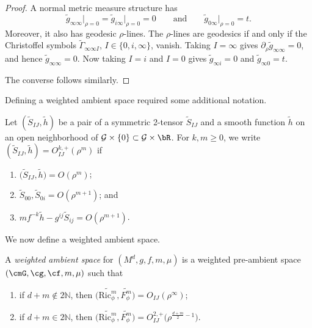 \begin{proof}
A normal metric measure structure has
\[
\widetilde{g}_{\infty\infty}\big|_{\rho=0}=\widetilde{g}_{i\infty}\big|_{\rho=0}=0 \qquad\text{and}\qquad \widetilde{g}_{0\infty}\big|_{\rho=0}=t.
\]
Moreover, it also has geodesic $\rho$-lines. The $\rho$-lines are geodesics if and only if the Christoffel symbols $\widetilde{\Gamma}_{\infty \infty I}$, $I\in \{0,i,\infty\}$, vanish. Taking $I=\infty$ gives $\partial_{\rho} \widetilde{g}_{\infty \infty}=0$, and hence $\widetilde{g}_{\infty \infty}=0 .$ Now taking $I=i$ and $I=0$ gives $\widetilde{g}_{\infty i}=0$ and $\widetilde{g}_{\infty 0}=t$.

The converse follows similarly.
\end{proof}
Defining a weighted ambient space required some additional notation.

\begin{Definition}
Let $(\widetilde{S}_{IJ},\widetilde{h})$ be a pair of a symmetric 2-tensor $\widetilde{S}_{IJ}$ and a smooth function $\widetilde{h}$ on an open neighborhood of $\mathcal{G}\times \{0\}\subset\mathcal{G}\times \bR$. For $k,m\geq 0$, we write $(\widetilde{S}_{IJ},\widetilde{h})=O_{IJ}^{k,+}(\rho^m)$ if
\begin{enumerate}[label=$(\roman*)$]\itemsep=0pt
\item $\big(\widetilde{S}_{IJ},\widetilde{h}\big)=O(\rho^{m})$;
\item $\widetilde{S}_{00},\widetilde{S}_{0i}=O(\rho^{m+1})$; and
\item $m f^{-k}\widetilde{h}-g^{ij}\widetilde{S}_{ij}= O(\rho^{m+1})$.
\end{enumerate}
\end{Definition}

We now define a weighted ambient space.

\begin{Definition}
A \emph{weighted ambient space} for $(M^d,g,f,m,\mu)$ is a weighted pre-ambient space $(\cmG,\cg,\cf,m,\mu)$ such that
\begin{enumerate}[label=$(\roman*)$]\itemsep=0pt
\item if $d+m\notin 2\mathbb{N}$, then $\big(\widetilde{\mathrm{Ric}_\phi^m},\widetilde{F_\phi^m}\big)=O_{IJ}(\rho^{\infty})$;

\item if $d+m\in 2\mathbb{N}$, then $\big(\widetilde{\mathrm{Ric}_\phi^m},\widetilde{F_\phi^m}\big)=O^{2,+}_{IJ}\big(\rho^{\frac{d+m}{2}-1}\big).$
 \end{enumerate}
\end{Definition}

